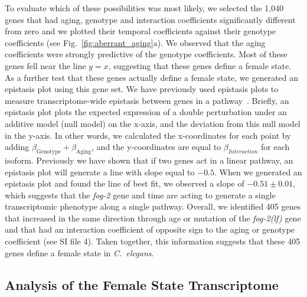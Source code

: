 \documentclass[9pt,twocolumn,twoside]{gsajnl}
\newcommand{\cel}{\emph{C.~elegans}}
\newcommand{\fog}{\emph{\mbox{fog-2(lf)}}}
\newcommand{\gene}[1]{\emph{\mbox{#1}}}
\newcommand{\intersectn}{1,040}
\newcommand{\femalen}{405}
\begin{document}
To evaluate which of these possibilities was most likely, we selected
the \intersectn{} genes that had aging, genotype and interaction coefficients
significantly different from zero and we plotted their temporal coefficients
against their genotype coefficients (see Fig.~\ref{fig:aberrant_aging}a). We
observed that the aging coefficients were strongly predictive of the genotype
coefficients. Most of these genes fell near the line $y=x$, suggesting that these
genes define a female state. As a further test that these genes actually define
a female state, we generated an epistasis plot using this gene set. We have
previously used epistasis plots to measure transcriptome-wide epistasis between
genes in a pathway~\citep{}.
Briefly, an epistasis plot plots the expected expression of a double perturbation
under an additive model (null model) on the x-axis, and the deviation from this
null model in the y-axis. In other words, we calculated the x-coordinates for each
point by adding $\beta_\mathrm{Genotype} + \beta_\mathrm{Aging}$, and the
y-coordinates are equal to $\beta_{Interaction}$ for each isoform.
Previously we have shown that if two genes act in a
linear pathway, an epistasis plot will generate a line with slope equal to $-0.5$.
When we generated an epistasis plot and found the line of best fit, we observed
a slope of $-0.51\pm 0.01$, which suggests that the \gene{fog-2} gene and time
are acting to generate a single transcriptomic phenotype along a single pathway.
Overall, we identified
\femalen{} genes that increased in the same direction through age or mutation
of the \fog{} gene and that had an interaction coefficient of opposite sign to
the aging or genotype coefficient (see SI file 4). Taken together, this
information suggests that these \femalen{} genes define a female state in
\cel{}.

\subsection*{Analysis of the Female State Transcriptome}
\end{document}
